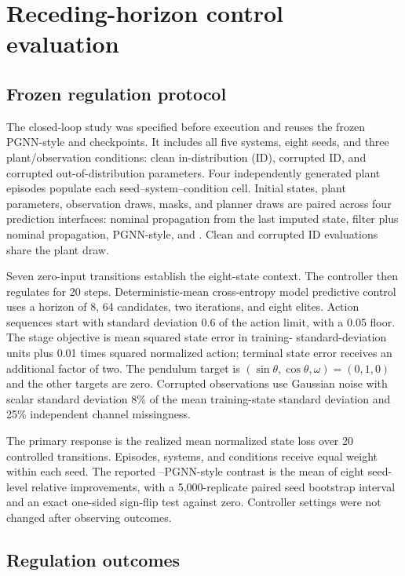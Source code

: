 \section{Receding-horizon control evaluation}

\subsection{Frozen regulation protocol}

The closed-loop study was specified before execution and reuses the frozen
PGNN-style and \method{} checkpoints. It includes all five systems, eight
seeds, and three plant/observation conditions: clean in-distribution (ID),
corrupted ID, and corrupted out-of-distribution parameters. Four independently
generated plant episodes populate each seed--system--condition cell. Initial
states, plant parameters, observation draws, masks, and planner draws are
paired across four prediction interfaces: nominal propagation from the last
imputed state, filter plus nominal propagation, PGNN-style, and \method. Clean
and corrupted ID evaluations share the plant draw.

Seven zero-input transitions establish the eight-state context. The controller
then regulates for 20 steps. Deterministic-mean cross-entropy model predictive
control uses a horizon of 8, 64 candidates, two iterations, and eight elites.
Action sequences start with standard deviation 0.6 of the action limit, with a
0.05 floor. The stage objective is mean squared state error in training-
standard-deviation units plus 0.01 times squared normalized action; terminal
state error receives an additional factor of two. The pendulum target is
$(\sin\theta,\cos\theta,\omega)=(0,1,0)$ and the other targets are zero.
Corrupted observations use Gaussian noise with scalar standard deviation 8\%
of the mean training-state standard deviation and 25\% independent channel
missingness.

The primary response is the realized mean normalized state loss over 20
controlled transitions. Episodes, systems, and conditions receive equal weight
within each seed. The reported \method{}--PGNN-style contrast is the mean of
eight seed-level relative improvements, with a 5,000-replicate paired seed
bootstrap interval and an exact one-sided sign-flip test against zero.
Controller settings were not changed after observing outcomes.

\subsection{Regulation outcomes}

